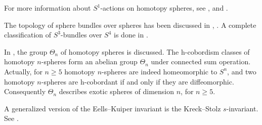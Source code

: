 \documentclass[twoside]{article}
\begin{document}
For more information about $S^1$-actions on homotopy spheres, see \cite{hsiang}, \cite{my} and  \cite{rs}.  


The topology of sphere bundles over spheres has been discussed in \cite{james1}, \cite{james2}. A complete classification of
$S^3$-bundles over $S^4$ is done in \cite{crowley}. 

In \cite{kervairemilnor}, the group $\Theta_n$ of homotopy  spheres is discussed. The h-cobordism classes of homotopy $n$-spheres form an abelian group $\Theta_n$ under connected sum operation. Actually, for $n \geq  5$ homotopy $n$-spheres are indeed homeomorphic to $S^n$, and two homotopy $n$-spheres are h-cobordant if and only if they are diffeomorphic. Consequently $\Theta_n$ describes exotic spheres of dimension $n$, for $n \geq  5$. 

A generalized version of the Eells--Kuiper invariant is the Kreck--Stolz $s$-invariant. See \cite{moduli}. 





\nocite{*}

\printbibliography
\end{document}
